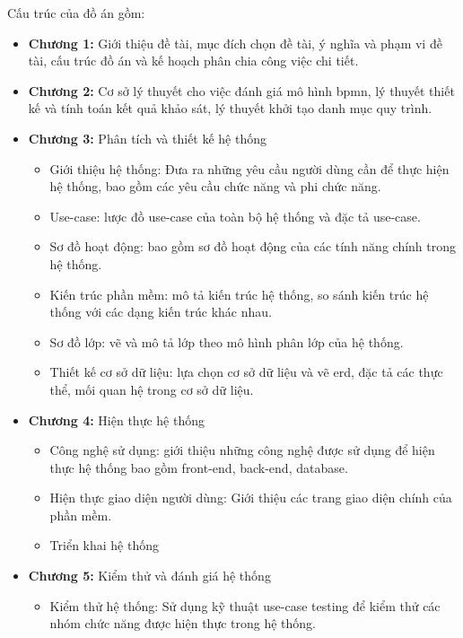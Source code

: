 Cấu trúc của đồ án gồm:
\begin{itemize}
      \item \textbf{Chương 1:} Giới thiệu đề tài, mục đích chọn đề tài, ý nghĩa và phạm vi đề tài, cấu trúc đồ án và kế hoạch phân chia công việc chi tiết.
      \item \textbf{Chương 2:} Cơ sở lý thuyết cho việc đánh giá mô hình \acrshort{bpmn}, lý thuyết thiết kế và tính toán kết quả khảo sát, lý thuyết khởi tạo danh mục quy trình.
      \item \textbf{Chương 3:} Phân tích và thiết kế hệ thống
          \begin{itemize}
            \item Giới thiệu hệ thống: Đưa ra những yêu cầu người dùng cần để thực hiện hệ thống,
                  bao gồm các yêu cầu chức năng và phi chức năng.
            \item Use-case: lược đồ use-case của toàn bộ hệ thống và đặc tả use-case.
            \item Sơ đồ hoạt động: bao gồm sơ đồ hoạt động của các tính năng chính trong hệ
                  thống.
            \item Kiến trúc phần mềm: mô tả kiến trúc hệ thống, so sánh kiến trúc hệ thống với
                  các dạng kiến trúc khác nhau.
            \item Sơ đồ lớp: vẽ và mô tả lớp theo mô hình phân lớp của hệ thống.
            \item Thiết kế cơ sở dữ liệu: lựa chọn cơ sở dữ liệu và vẽ \acrfull*{erd}, đặc tả các thực thể,
                  mối quan hệ trong cơ sở dữ liệu.
          \end{itemize}
      \item \textbf{Chương 4:} Hiện thực hệ thống
          \begin{itemize}
            \item Công nghệ sử dụng: giới thiệu những công nghệ được sử dụng để hiện thực hệ
                  thống bao gồm front-end, back-end, database.
            \item Hiện thực giao diện người dùng: Giới thiệu các trang giao diện chính của phần
                  mềm.
            \item Triển khai hệ thống
          \end{itemize}
      \item \textbf{Chương 5:} Kiểm thử và đánh giá hệ thống
          \begin{itemize}
            \item Kiểm thử hệ thống: Sử dụng kỹ thuật use-case testing để kiểm thử các nhóm chức năng được hiện thực trong hệ thống.

\end{itemize}
\end{itemize}
